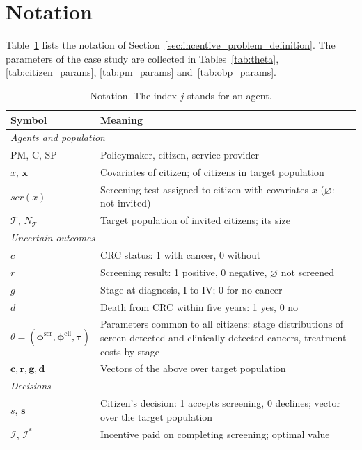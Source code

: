 \documentclass[12pt]{article}
\begin{document}
\section{Notation}\label{app:notation}

Table~\ref{tab:notation} lists the notation of Section~\ref{sec:incentive_problem_definition}. The parameters of the case study are collected in Tables~\ref{tab:theta}, \ref{tab:citizen_params}, \ref{tab:pm_params} and~\ref{tab:obp_params}.

\begin{table}[htbp]
\centering
\footnotesize
\caption{Notation. The index $j$ stands for an agent.}
\label{tab:notation}
\renewcommand{\arraystretch}{1.0}
\begin{tabular}{l p{11.5cm}}
\toprule
\textbf{Symbol} & \textbf{Meaning} \\
\midrule
\multicolumn{2}{l}{\emph{Agents and population}} \\
PM, C, SP & Policymaker, citizen, service provider \\
$x$, $\mathbf{x}$ & Covariates of citizen; of citizens in target population \\
$scr(x)$ & Screening test assigned to citizen with covariates $x$ ($\varnothing$: not invited) \\
$\mathcal{T}$, $N_{\mathcal{T}}$ & Target population of invited citizens; its size \\
\midrule
\multicolumn{2}{l}{\emph{Uncertain outcomes}} \\
$c$ & CRC status: 1 with cancer, 0 without \\
$r$ & Screening result: 1 positive, 0 negative, $\varnothing$ not screened \\
$g$ & Stage at diagnosis, I to IV; 0 for no cancer \\
$d$ & Death from CRC within five years: 1 yes, 0 no \\
$\theta = (\boldsymbol{\phi}^{\text{scr}}, \boldsymbol{\phi}^{\text{cli}}, \boldsymbol{\tau})$ & Parameters common to all citizens: stage distributions of screen-detected and clinically detected cancers, treatment costs by stage \\
$\mathbf{c}, \mathbf{r}, \mathbf{g}, \mathbf{d}$ & Vectors of the above over target population \\
\midrule
\multicolumn{2}{l}{\emph{Decisions}} \\
$s$, $\mathbf{s}$ & Citizen's decision: 1 accepts screening, 0 declines; vector over the target population \\
$\mathcal{I}$, $\mathcal{I}^*$ & Incentive paid on completing screening; optimal value \\

\end{tabular}
\end{table}
\end{document}
